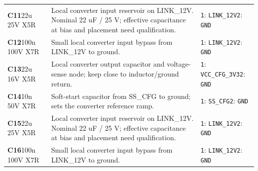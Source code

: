 \documentclass[11pt,a4paper]{article}
\begin{document}
\begin{longtable}{@{}P{27mm}P{84mm}P{57mm}@{}}
\textbf{C11}\newline 22u 25V X5R & Local converter input reservoir on LINK\_12V. Nominal 22 uF / 25 V; effective capacitance at bias and placement need qualification. & \nolinkurl{1}: \nolinkurl{LINK_12V}\newline \nolinkurl{2}: \nolinkurl{GND} \\
\textbf{C12}\newline 100n 100V X7R & Small local converter input bypass from LINK\_12V to ground. & \nolinkurl{1}: \nolinkurl{LINK_12V}\newline \nolinkurl{2}: \nolinkurl{GND} \\
\textbf{C13}\newline 22u 16V X5R & Local converter output capacitor and voltage-sense node; keep close to inductor/ground return. & \nolinkurl{1}: \nolinkurl{VCC_CFG_3V3}\newline \nolinkurl{2}: \nolinkurl{GND} \\
\textbf{C14}\newline 10n 50V X7R & Soft-start capacitor from SS\_CFG to ground; sets the converter reference ramp. & \nolinkurl{1}: \nolinkurl{SS_CFG}\newline \nolinkurl{2}: \nolinkurl{GND} \\
\textbf{C15}\newline 22u 25V X5R & Local converter input reservoir on LINK\_12V. Nominal 22 uF / 25 V; effective capacitance at bias and placement need qualification. & \nolinkurl{1}: \nolinkurl{LINK_12V}\newline \nolinkurl{2}: \nolinkurl{GND} \\
\textbf{C16}\newline 100n 100V X7R & Small local converter input bypass from LINK\_12V to ground. & \nolinkurl{1}: \nolinkurl{LINK_12V}\newline \nolinkurl{2}: \nolinkurl{GND} \\

\end{longtable}
\end{document}
